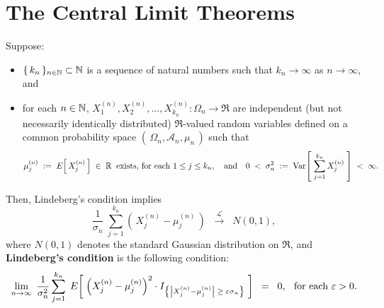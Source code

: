 

\section{The Central Limit Theorems}
\setcounter{theorem}{0}
\setcounter{equation}{0}

\renewcommand{\theenumi}{\alph{enumi}}
\renewcommand{\labelenumi}{\textnormal{(\theenumi)}$\;\;$}

\begin{theorem}
\mbox{}\vskip 0.2cm
\noindent
Suppose:
\begin{itemize}
\item	$\{\,k_{n}\,\}_{n\in\mathbb{N}}\subset\mathbb{N}$ is a sequence of natural numbers such that $k_{n} \rightarrow \infty$ as $n \rightarrow \infty$, and
\item	for each $n \in \mathbb{N}$, $X^{(n)}_{1}, X^{(n)}_{2}, \ldots, X^{(n)}_{k_{n}} : \Omega_{n} \longrightarrow \Re$
		are independent (but not necessarily identically distributed)
		$\Re$-valued random variables defined on a common probability space
		$\left(\,\Omega_{n},\mathcal{A}_{n},\mu_{n}\,\right)$ such that
		\begin{equation*}
		\mu^{(n)}_{j} \;:=\; E\!\left[\,X^{(n)}_{j}\,\right] \;\in\; \mathbb{R} \;\;\textnormal{exists, for each $1 \leq j \leq k_{n}$},
		\quad\textnormal{and}\quad
		0 \;<\; \sigma^{2}_{n} \;:=\; \textnormal{Var}\!\left[\;\overset{k_{n}}{\underset{j=1}{\sum}}\,X^{(n)}_{j}\;\right] \;<\; \infty.
		\end{equation*}
\end{itemize}
Then, Lindeberg's condition implies
\begin{equation*}
\dfrac{1}{\sigma_{n}}\;\sum^{k_{n}}_{j=1}\left(\,X^{(n)}_{j} - \mu^{(n)}_{j}\,\right)
\;\;\overset{\mathcal{L}}{\longrightarrow}\;\;
N(0,1),
\end{equation*}
where $N(0,1)$ denotes the standard Gaussian distribution on $\Re$,
and \textbf{Lindeberg's condition} is the following condition:
\begin{equation*}
\lim_{n\rightarrow\infty}\;
\dfrac{1}{\sigma^{2}_{n}}
\sum_{j=1}^{k_{n}}\;
E\!\left[\;
\left(X^{(n)}_{j} - \mu^{(n)}_{j}\right)^{2}
\cdot
I_{\left\{\left\vert X^{(n)}_{j} - \mu^{(n)}_{j}\right\vert \;\geq\; \varepsilon \sigma_{n}\right\}}
\;\right]
\;\;=\;\;
0,
\;\;\,
\textnormal{for each $\varepsilon > 0$}.
\end{equation*}
\end{theorem}

